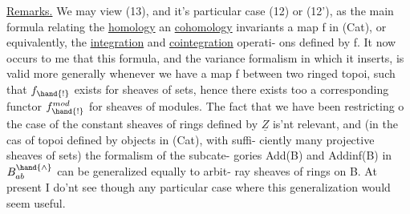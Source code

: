 \uline{Remarks.}
We may view (13), and it's particular case (12) or (12'), as
the main formula relating the \uline{homology} an \uline{cohomology} invariants   a map
f in (Cat), or equivalently, the  \uline{integration} and \uline{cointegration} operati-%
ons defined by f. It now occurs to me that this formula,  and the
variance formalism in which it inserts, is valid more generally whenever
we have a map f between two  ringed topoi, such that $f_\hand{!}$ exists
for sheaves of sets, hence there exists too a corresponding functor
$f^{mod}_\hand{!}$ for sheaves of modules. The fact that we have been restricting o
the case of the constant sheaves of rings defined by $\underline{Z}$ is'nt relevant,
and (in the cas of topoi defined by objects in (Cat),   with suffi-%
ciently many projective sheaves of sets) the formalism of the subcate-%
gories Add(B) and Addinf(B) in $B^\hand{\wedge}_{ab}$ can be generalized equally to arbit-%
ray  sheaves of rings on B. At present I do'nt see though
any   particular case where this generalization would seem
useful.


